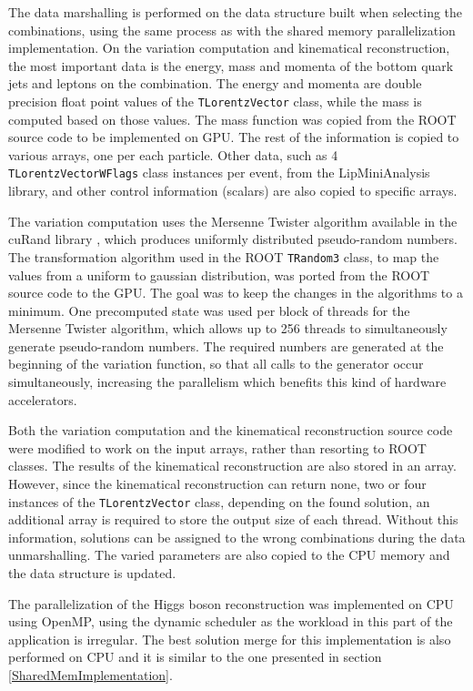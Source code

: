 The data marshalling is performed on the data structure built when selecting the combinations, using the same process as with the shared memory parallelization implementation. On the variation computation and kinematical reconstruction, the most important data is the energy, mass and momenta of the bottom quark jets and leptons on the combination. The energy and momenta are double precision float point values of the \texttt{TLorentzVector} class, while the mass is computed based on those values. The mass function was copied from the ROOT source code to be implemented on GPU. The rest of the information is copied to various arrays, one per each particle. Other data, such as 4 \texttt{TLorentzVectorWFlags} class instances per event, from the LipMiniAnalysis library, and other control information (scalars) are also copied to specific arrays.

The variation computation uses the Mersenne Twister algorithm available in the \nvidia cuRand library \cite{NVIDIA:cuRand}, which produces uniformly distributed pseudo-random numbers. The transformation algorithm used in the ROOT \texttt{TRandom3} class, to map the values from a uniform to gaussian distribution, was ported from the ROOT source code to the GPU. The goal was to keep the changes in the \ttDilepKinFit algorithms to a minimum. One precomputed state was used per block of threads for the Mersenne Twister algorithm, which allows up to 256 threads to simultaneously generate pseudo-random numbers. The required numbers are generated at the beginning of the variation function, so that all calls to the generator occur simultaneously, increasing the parallelism which benefits this kind of hardware accelerators.

Both the variation computation and the kinematical reconstruction source code were modified to work on the input arrays, rather than resorting to ROOT classes. The results of the kinematical reconstruction are also stored in an array. However, since the kinematical reconstruction can return none, two or four instances of the \texttt{TLorentzVector} class, depending on the found solution, an additional array is required to store the output size of each thread. Without this information, solutions can be assigned to the wrong combinations during the data unmarshalling. The varied parameters are also copied to the CPU memory and the data structure is updated.

The parallelization of the Higgs boson reconstruction was implemented on CPU using OpenMP, using the dynamic scheduler as the workload in this part of the application is irregular. The best solution merge for this implementation is also performed on CPU and it is similar to the one presented in section \ref{SharedMemImplementation}.


